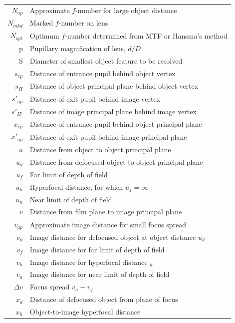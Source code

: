 \documentclass[11pt, oneside]{scrartcl}   	%
\newcommand{\Dv}{\ensuremath{\Delta v}}
\begin{document}
\begin{center}
\begin{tabular}{r@{~=~}l}
$N_{ap}$ & Approximate $f$-number for large object distance     \\
$N_{mkd}$ & Marked $f$-number on lens     \\
$N_{opt}$ & Optimum $f$-number determined from MTF or Hansma’s method     \\
p & Pupillary magnification of lens, $d/D$     \\
S & Diameter of smallest object feature to be resolved      \\
$s_{ep}$ & Distance of entrance pupil behind object vertex     \\
$s_{H}$ & Distance of object principal plane behind object vertex      \\
$s'_{ap}$ & Distance of exit pupil behind image vertex     \\
$s'_{H'}$ & Distance of image principal plane behind image vertex     \\
$x_{ep }$& Distance of entrance pupil behind object principal plane      \\
$x'_{ap}$ & Distance of exit pupil behind image principal plane     \\
$u$ & Distance from object to object principal plane     \\
$u_d$ & Distance from defocused object to object principal plane     \\
$u_f$ & Far limit of depth of field     \\
$u_h$ & Hyperfocal distance, for which $u_f = \infty$      \\
$u_n$ & Near limit of depth of field     \\
$v$ & Distance from film plane to image principal plane      \\
$v_{ap}$ & Approximate image distance for small focus spread     \\
$v_d$ & Image distance for defocused object at object distance $u_d$      \\
$v_f$ & Image distance for far limit of depth of field     \\
$v_h$ & Image distance for hyperfocal distance $_h$     \\
$v_n$ & Image distance for near limit of depth of field      \\
$\Dv$ & Focus spread $v_n - v_f$     \\
$x_d$ & Distance of defocused object from plane of focus      \\
$x_h$ & Object-to-image hyperfocal distance     \\
\end{tabular}
\end{center}
\end{document}
